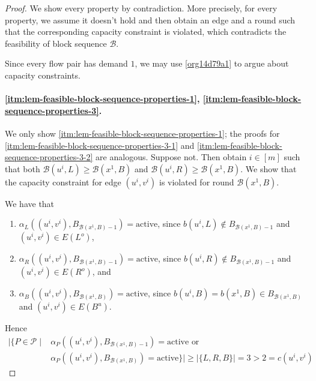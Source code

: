 \documentclass[fontsize=11pt,paper=a4]{book}
\begin{document}
\begin{proof}
We show every property by contradiction.
More precisely, for every property, we assume it doesn't hold and then obtain an edge and a round such that the corresponding capacity constraint is violated, which contradicts the feasibility of block sequence \(\mathcal{B}\).

Since every flow pair has demand \(1\), we may use \ref{org14d79a1} to argue about capacity constraints.

\paragraph{\ref{itm:lem-feasible-block-sequence-properties-1}, \ref{itm:lem-feasible-block-sequence-properties-3}.}
We only show \ref{itm:lem-feasible-block-sequence-properties-1}; the proofs for \ref{itm:lem-feasible-block-sequence-properties-3-1} and \ref{itm:lem-feasible-block-sequence-properties-3-2} are analogous.
Suppose not.
Then obtain \(i\in[m]\) such that both \(\mathcal{B}(u^i,L)\geq\mathcal{B}(x^1,B)\) and \(\mathcal{B}(u^i,R)\geq\mathcal{B}(x^1,B)\).
We show that the capacity constraint for edge \((u^i,v^i)\) is violated for round \(\mathcal{B}(x^1,B)\).

We have that

\begin{enumerate}
\item \(\alpha_L((u^i,v^i),B_{\mathcal{B}(x^1,B)-1})=\mathrm{active}\), since \(b(u^i,L)\notin B_{\mathcal{B}(x^1,B)-1}\) and \((u^i,v^i)\in E(L^o)\),

\item \(\alpha_R((u^i,v^i),B_{\mathcal{B}(x^1,B)-1})=\mathrm{active}\), since \(b(u^i,R)\notin B_{\mathcal{B}(x^1,B)-1}\) and \((u^i,v^i)\in E(R^o)\), and

\item \(\alpha_B((u^i,v^i),B_{\mathcal{B}(x^1,B)})=\mathrm{active}\), since \(b(u^i,B)=b(x^1,B)\in B_{\mathcal{B}(x^1,B)}\) and \((u^i,v^i)\in E(B^u)\).
\end{enumerate}

Hence
\begin{align*}
\lvert\{P\in\mathcal{P}\mid&\alpha_P((u^i,v^i),B_{\mathcal{B}(x^1,B)-1})=\mathrm{active}\text{ or }\\
&\alpha_P((u^i,v^i),B_{\mathcal{B}(x^1,B)})=\mathrm{active}\}\rvert\geq\lvert\{L,R,B\}\rvert=3>2=c(u^i,v^i)
\end{align*}


\end{proof}
\end{document}
